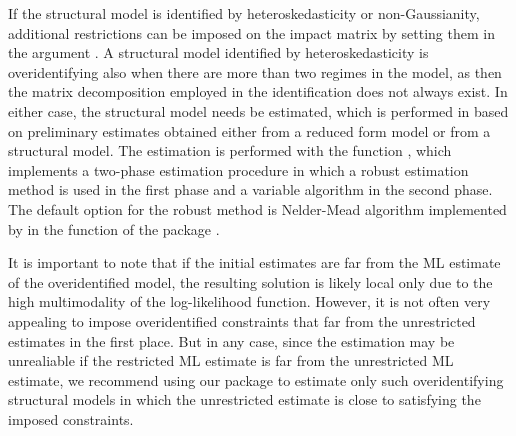 \documentclass[nojss]{jss}
\begin{document}
If the structural model is identified by heteroskedasticity or non-Gaussianity, additional restrictions can be imposed on the impact matrix by setting them in the argument . A structural model identified by heteroskedasticity is overidentifying also when there are more than two regimes in the model, as then the matrix decomposition employed in the identification does not always exist. In either case, the structural model needs be estimated, which is performed in  based on preliminary estimates obtained either from a reduced form model or from a structural model. The estimation is performed with the function , which implements a two-phase estimation procedure in which a robust estimation method is used in the first phase and a variable algorithm in the second phase. The default option for the robust method is Nelder-Mead algorithm implemented by \cite{R} in the function  of the package .

It is important to note that if the initial estimates are far from the ML estimate of the overidentified model, the resulting solution is likely local only due to the high multimodality of the log-likelihood function. However, it is not often very appealing to impose overidentified constraints that far from the unrestricted estimates in the first place. But in any case, since the estimation may be unrealiable if the restricted ML estimate is far from the unrestricted ML estimate, we recommend using our package to estimate only such overidentifying structural models in which the unrestricted estimate is close to satisfying the imposed constraints.
\end{document}

